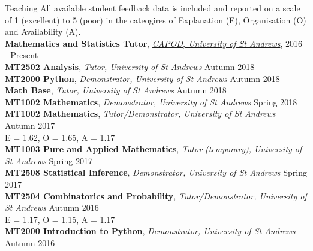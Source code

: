 \documentclass{resume} %
\begin{document}
\begin{rSection}{Teaching}
All available student feedback data is included and reported on a scale of 1 (excellent) to 5 (poor) in the cateogires of Explanation (E), Organisation (O) and Availability (A).\\

\textbf{Mathematics and Statistics Tutor}, \href{https://www.st-andrews.ac.uk/capod}{\emph{CAPOD, University of St Andrews}}, \hfill 2016 - Present\\
\textbf{MT2502 Analysis}, \emph{Tutor, University of St Andrews} \hfill Autumn 2018 \\
\textbf{MT2000 Python}, \emph{Demonstrator, University of St Andrews} \hfill Autumn 2018 \\
\textbf{Math Base}, \emph{Tutor, University of St Andrews} \hfill Autumn 2018 \\
\textbf{MT1002 Mathematics}, \emph{Demonstrator, University of St Andrews} \hfill Spring 2018 \\
\textbf{MT1002 Mathematics}, \emph{Tutor/Demonstrator, University of St Andrews} \hfill Autumn 2017 \\
E = 1.62, O = 1.65, A = 1.17\\
\textbf{MT1003 Pure and Applied Mathematics}, \emph{Tutor (temporary), University of St Andrews} \hfill Spring 2017 \\
\textbf{MT2508 Statistical  Inference}, \emph{Demonstrator, University of St Andrews} \hfill Spring 2017 \\
\textbf{MT2504 Combinatorics and Probability}, \emph{Tutor/Demonstrator, University of St Andrews} \hfill Autumn 2016 \\
E = 1.17, O = 1.15, A = 1.17\\
\textbf{MT2000 Introduction to Python}, \emph{Demonstrator, University of St Andrews} \hfill Autumn 2016 \\
\end{rSection}
\end{document}
